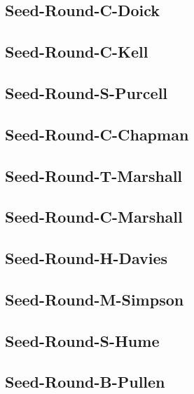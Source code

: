 \documentclass[letterpaper,10pt,openany,oneside,english]{sphinxmanual}
\begin{document}
\subsection{Seed-Round-C-Doick}
\label{\detokenize{statements:seed-round-c-doick}}

\subsection{Seed-Round-C-Kell}
\label{\detokenize{statements:seed-round-c-kell}}

\subsection{Seed-Round-S-Purcell}
\label{\detokenize{statements:seed-round-s-purcell}}

\subsection{Seed-Round-C-Chapman}
\label{\detokenize{statements:seed-round-c-chapman}}

\subsection{Seed-Round-T-Marshall}
\label{\detokenize{statements:seed-round-t-marshall}}

\subsection{Seed-Round-C-Marshall}
\label{\detokenize{statements:seed-round-c-marshall}}

\subsection{Seed-Round-H-Davies}
\label{\detokenize{statements:seed-round-h-davies}}

\subsection{Seed-Round-M-Simpson}
\label{\detokenize{statements:seed-round-m-simpson}}

\subsection{Seed-Round-S-Hume}
\label{\detokenize{statements:seed-round-s-hume}}

\subsection{Seed-Round-B-Pullen}
\label{\detokenize{statements:seed-round-b-pullen}}
\end{document}

